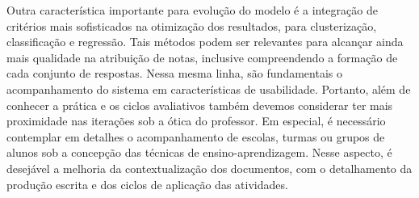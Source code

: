 Outra característica importante para evolução do modelo é a integração de critérios mais sofisticados na otimização dos resultados, para clusterização, classificação e regressão. Tais métodos podem ser relevantes para alcançar ainda mais qualidade na atribuição de notas, inclusive compreendendo a formação de cada conjunto de respostas. Nessa mesma linha, são fundamentais o acompanhamento do sistema em características de usabilidade. Portanto, além de conhecer a prática e os ciclos avaliativos também devemos considerar ter mais proximidade nas iterações sob a ótica do professor. Em especial, é necessário contemplar em detalhes o acompanhamento de escolas, turmas ou grupos de alunos sob a concepção das técnicas de ensino-aprendizagem. Nesse aspecto, é desejável a melhoria da contextualização dos documentos, com o detalhamento da produção escrita e dos ciclos de aplicação das atividades.